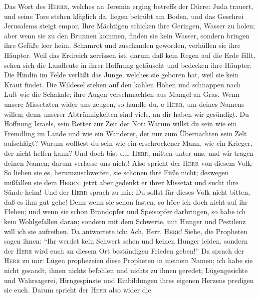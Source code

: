  Das Wort des \textsc{Herrn}, welches an Jeremia erging
betreffs der Dürre: Juda trauert,  und seine Tore stehen
kläglich da, liegen betrübt am Boden, und das Geschrei Jerusalems steigt
empor.  Ihre Mächtigen schicken ihre Geringen, Wasser zu
holen; aber wenn sie zu den Brunnen kommen, finden sie kein Wasser,
sondern bringen ihre Gefäße leer heim. Schamrot und zuschanden geworden,
verhüllen sie ihre Häupter.  Weil das Erdreich zerrissen
ist, darum daß kein Regen auf die Erde fällt, sehen sich die Landleute
in ihrer Hoffnung getäuscht und bedecken ihre Häupter. 
Die Hindin im Felde verläßt das Junge, welches sie geboren hat, weil sie
kein Kraut findet.  Die Wildesel stehen auf den kahlen
Höhen und schnappen nach Luft wie die Schakale; ihre Augen verschmachten
aus Mangel an Gras.  Wenn unsere Missetaten wider uns
zeugen, so handle du, o \textsc{Herr}, um deines Namens willen; denn
unserer Abtrünnigkeiten sind viele, an dir haben wir gesündigt.
 Du Hoffnung Israels, sein Retter zur Zeit der Not: Warum
willst du sein wie ein Fremdling im Lande und wie ein Wanderer, der nur
zum Übernachten sein Zelt aufschlägt?  Warum wolltest du
sein wie ein erschrockener Mann, wie ein Krieger, der nicht helfen kann?
Und doch bist du, \textsc{Herr}, mitten unter uns, und wir tragen deinen
Namen; darum verlasse uns nicht!  Also spricht der
\textsc{Herr} von diesem Volk: So lieben sie es, herumzuschweifen, sie
schonen ihre Füße nicht; deswegen mißfallen sie dem \textsc{Herrn}:
jetzt aber gedenkt er ihrer Missetat und sucht ihre Sünde heim!
 Und der \textsc{Herr} sprach zu mir: Du sollst für
dieses Volk nicht bitten, daß es ihm gut gehe!  Denn wenn
sie schon fasten, so höre ich doch nicht auf ihr Flehen; und wenn sie
schon Brandopfer und Speisopfer darbringen, so habe ich kein
Wohlgefallen daran; sondern mit dem Schwerte, mit Hunger und Pestilenz
will ich sie aufreiben.  Da antwortete ich: Ach, Herr,
\textsc{Herr}! Siehe, die Propheten sagen ihnen: ``Ihr werdet kein
Schwert sehen und keinen Hunger leiden, sondern der \textsc{Herr} wird
euch an diesem Ort beständigen Frieden geben!''  Da
sprach der \textsc{Herr} zu mir: Lügen prophezeien diese Propheten in
meinem Namen; ich habe sie nicht gesandt, ihnen nichts befohlen und
nichts zu ihnen geredet; Lügengesichte und Wahrsagerei, Hirngespinste
und Einbildungen ihres eigenen Herzens predigen sie euch.
 Darum spricht der \textsc{Herr} also wider die

